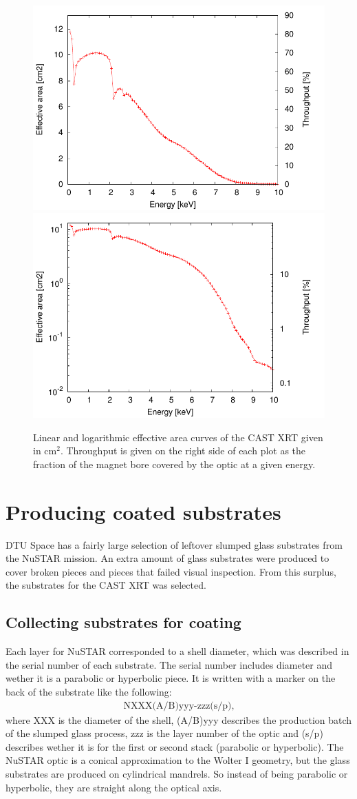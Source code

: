 \begin{figure}[htbp]
  \centering
  \includegraphics[width=0.47\linewidth]{figures/cast/pt-c_effara_throughput_lin.pdf}
  \includegraphics[width=0.47\linewidth]{figures/cast/pt-c_effara_throughput_log.pdf}
  \caption{\footnotesize Linear and logarithmic effective area curves of the CAST XRT given in cm$^2$. Throughput is given on the right side of each plot as the fraction of the magnet bore covered by the optic at a given energy.}
  \label{fig:pt-c_effarea_throughput}
\end{figure}

\section{Producing coated substrates}
DTU Space has a fairly large selection of leftover slumped glass substrates from the NuSTAR mission. An extra amount of glass substrates were produced to cover broken pieces and pieces that failed visual inspection. From this surplus, the substrates for the CAST XRT was selected.

\subsection{Collecting substrates for coating}
Each layer for NuSTAR corresponded to a shell diameter, which was described in the serial number of each substrate. The serial number includes diameter and wether it is a parabolic or hyperbolic piece. It is written with a marker on the back of the substrate like the following:
\begin{eqnarray}
  \text{NXXX(A/B)yyy-zzz(s/p),}\nonumber
\end{eqnarray}
where XXX is the diameter of the shell, (A/B)yyy describes the production batch of the slumped glass process, zzz is the layer number of the optic and (s/p) describes wether it is for the first or second stack (parabolic or hyperbolic). The NuSTAR optic is a conical approximation to the Wolter I geometry, but the glass substrates are produced on cylindrical mandrels. So instead of being parabolic or hyperbolic, they are straight along the optical axis.

